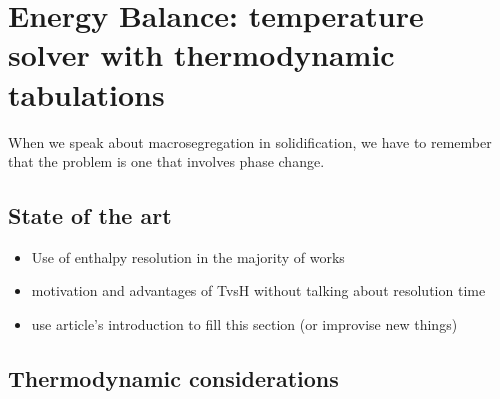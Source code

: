 \chapter{Energy Balance: temperature solver with thermodynamic tabulations}
\begin{nolinkcolors} 
\minitoc
\end{nolinkcolors}
\newpage



When we speak about macrosegregation in solidification, we have to remember that the problem is one that involves phase change.


\section{State of the art}
\begin{itemize}
\item Use of enthalpy resolution in the majority of works 
\item motivation and advantages of TvsH without talking about resolution time
\item use article's introduction to fill this section (or improvise new things)
\end{itemize}


\section{Thermodynamic considerations}

